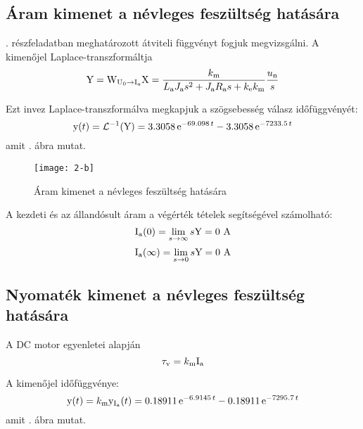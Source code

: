 
\subsection{Áram kimenet a névleges feszültség hatására}

. részfeladatban meghatározott átviteli függvényt fogjuk megvizsgálni.
%
A kimenőjel Laplace-transzformáltja
\begin{equation}
	\mathrm{Y} = \mathrm{W}_{\mathrm{U}_0\rightarrow \mathrm{I}_\text{a}}\mathrm{X} = \frac{k_\text{m} }{L_\text{a}J_\text{a} s^2 + J_\text{a}R_\text{a} s + k_\text{e}k_\text{m}}\frac{u_\text{n}}{s}
\end{equation}

Ezt invez Laplace-transzformálva megkapjuk a szögsebesség válasz időfüggvényét:
\begin{equation}
	\mathrm{y}(t) = \mathcal{L}^{-1}(\mathrm{Y}) = 
	3.3058\, \mathrm{e}^{- 69.098\, t} - 3.3058\, \mathrm{e}^{- 7233.5\, t}
\end{equation}
amit . ábra mutat.

\begin{figure}[H]
	\centering
	\texttt{[image: 2-b]}
	\caption{Áram kimenet a névleges feszültség hatására}
	\label{fig:2-b}
\end{figure}

A kezdeti és az állandósult áram a végérték tételek segítségével számolható:
\begin{equation}
	\mathrm{I}_\text{a}(0) = \lim\limits_{s\rightarrow \infty}s\mathrm{Y} = 0\text{ A}
\end{equation}
\begin{equation}
	\mathrm{I}_\text{a}(\infty) = \lim\limits_{s\rightarrow 0}s\mathrm{Y} = 0\text{ A}
\end{equation}


\subsection{Nyomaték kimenet a névleges feszültség hatására}

A DC motor egyenletei alapján
\begin{equation}
	\tau_\text{v} = k_\text{m} \mathrm{I}_\text{a}
\end{equation}

A kimenőjel időfüggvénye:
\begin{equation}
	\mathrm{y}(t) = k_\text{m} \mathrm{y}_{\mathrm{I}_\text{a}}(t) =
	0.18911\, \mathrm{e}^{- 6.9145\, t} - 0.18911\, \mathrm{e}^{- 7295.7\, t}
\end{equation}
amit . ábra mutat.

